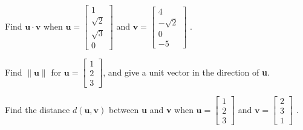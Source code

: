 \documentclass[12pt,letterpaper]{hmcpset}
\begin{document}

\begin{problem}[5]
Find $\mathbf{u} \cdot \mathbf{v}$ when  $\mathbf{u} = \begin{bmatrix}
1 \\
\sqrt{2} \\
\sqrt{3} \\
0
\end{bmatrix}$ and $\mathbf{v} =  \begin{bmatrix}
4 \\
-\sqrt{2} \\
0 \\
-5
\end{bmatrix}$ .
\end{problem}

\begin{solution}
\end{solution}
\newpage

\begin{problem}[9]
Find $\| \mathbf{u} \|$ for $\mathbf{u} = \begin{bmatrix}
1 \\
2 \\
3
\end{bmatrix}$, and give a unit vector in the direction of \textbf{u}.
\end{problem}


\begin{solution}
\end{solution}
\newpage

\begin{problem}[15]
Find the distance $d(\mathbf{u}, \mathbf{v})$ between \textbf{u} and \textbf{v} when  $\mathbf{u} = \begin{bmatrix}
1 \\
2 \\
3
\end{bmatrix}$ and $\mathbf{v} =  \begin{bmatrix}
2 \\
3 \\
1
\end{bmatrix}$ .
\end{problem}

\begin{solution}
\end{solution}
\newpage
\end{document}
